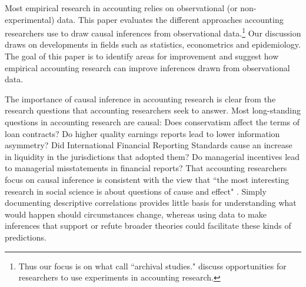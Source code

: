 \documentclass[12pt,reqno,titlepage]{amsart}
\theoremstyle{definition}
\begin{document}
\begin{doublespace} 
Most empirical research in accounting relies on observational (or non-experimental) data.
This paper evaluates the different approaches accounting researchers use to draw causal inferences from observational data.\footnote{Thus our focus is on what \citet{Bloomfield:2015aa} call ``archival studies." 
\cite{Floyd:2015aa} discuss opportunities for researchers to use experiments in accounting research.} 
Our discussion draws on developments in fields such as statistics, econometrics and epidemiology. 
The goal of this paper is to identify areas for improvement and suggest how empirical accounting research can improve inferences drawn from observational data.

The importance of causal inference in accounting research is clear from the research questions that accounting researchers seek to answer. 
Most long-standing questions in accounting research are causal: 
Does conservatism affect the terms of loan contracts?
Do higher quality earnings reports lead to lower information asymmetry? 
Did International Financial Reporting Standards cause an increase in liquidity in the jurisdictions that adopted them?
Do managerial incentives lead to managerial misstatements in financial reports?
That accounting researchers focus on causal inference is consistent with the view that ``the most interesting research in social science is about questions of cause and effect" \cite[p.\,3]{Angrist:2008vk}.
Simply documenting descriptive correlations provides little basis for understanding what would happen should circumstances change, 
whereas using data to make inferences that support or refute broader theories could facilitate these kinds of predictions.



\end{doublespace}
\end{document}
